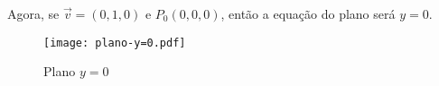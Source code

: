 \begin{exemplos}
\begin{enumerate}
\begin{solucao}
\begin{figure}[!h]
            \end{figure}
            Agora, se $\vec{v} = (0,1,0)$ e $P_0(0,0,0)$, ent\~ao a equa\c{c}\~ao do plano ser\'a $y = 0$.
            \begin{figure}[!h]
                \centering
                \caption{Plano $y = 0$}
                \texttt{[image: plano-y=0.pdf]}

\end{figure}
\end{solucao}
\end{enumerate}
\end{exemplos}
